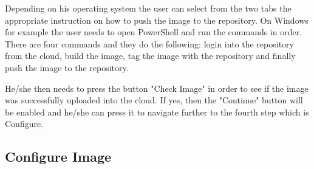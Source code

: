 Depending on his operating system the user can select from the two tabs the appropriate instruction on how to push the image to the repository. On Windows for example the user needs to open PowerShell and run the commands in order. There are four commands and they do the following: login into the repository from the cloud, build the image, tag the image with the repository and finally push the image to the repository.

He/she then needs to press the button "Check Image" in order to see if the image was successfully uploaded into the cloud. If yes, then the "Continue" button will be enabled and he/she can press it to navigate further to the fourth step which is Configure.

\newpage

\subsection{Configure Image}
\label{chap:05:01:04}

